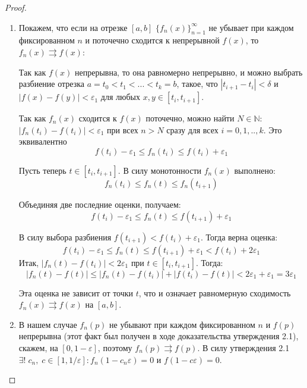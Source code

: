 \documentclass[12pt]{article}
\theoremstyle{plain}
\theoremstyle{definition}
\theoremstyle{remark}
\begin{document}
\begin{proof}
\begin{enumerate}
\begin{enumerate}[label=(\roman*):, font=\textit]
    \end{enumerate}

    Наконец, из всего этого следует, что 
    \[
        \text{ES}_p(X_n) \to \text{ES}_p(X) \text{ для всех } p \in [0, 1).
    \]

    Таким образом при всех $p \in [0,1)$ выполнено:
    \[
        f_n(p)\to f(p):=\text{ES}_p(X)-\text{VaR}_{1-\varepsilon}(X)
    \]

    \item 

    Покажем, что если на отрезке $[a,b]$ $\{f_n(x)\}_{n=1}^\infty$ не убывает при каждом фиксированном $n$ и поточечно сходится к непрерывной $f(x)$, то $f_n(x) \rightrightarrows f(x)$:

    Так как $f(x)$ непрерывна, то она равномерно непрерывно, и можно выбрать разбиение отрезка $a=t_0<t_1<...<t_k=b$, такое, что $|t_{i+1}-t_i|<\delta$ и $|f(x)-f(y)|<\varepsilon_1$ для любых $x,y\in [t_i,t_{i+1}]$.

    Так как $f_n(x)$ сходится к $f(x)$ поточечно, можно найти $N\in\mathbb{N}$: $|f_n(t_i)-f(t_i)|<\varepsilon_1$ при всех $n>N$ сразу для всех $i=0,1,..,k$. Это эквивалентно 
    \[
        f(t_i) -\varepsilon_1 \leq f_n(t_i) \leq f(t_i) +\varepsilon_1
    \]

    Пусть теперь $t\in [t_i,t_{i+1}]$. В силу монотонности $f_n(x)$ выполнено:
    \[
        f_n(t_i) \leq f_n(t) \leq f_n(t_{i+1})
    \]

    Объединяя две последние оценки, получаем:
    \[
        f(t_i) -\varepsilon_1 \leq f_n(t) \leq f(t_{i+1}) +\varepsilon_1
    \]

    В силу выбора разбиения $f(t_{i+1}) < f(t_i) + \varepsilon_1$. Тогда верна оценка:
    \[
        f(t_i) -\varepsilon_1 \leq f_n(t) \leq f(t_{i+1}) +\varepsilon_1 < f(t_i)+2\varepsilon_1
    \]
    Итак, $|f_n(t)-f(t_i)| < 2\varepsilon_1$ при $t\in[t_i, t_{i+1}]$. Тогда:
    \[
        |f_n(t)-f(t)| \leq |f_n(t)-f(t_i)| + |f(t_i)-f(t)| < 2\varepsilon_1 + \varepsilon_1 = 3\varepsilon_1
    \]

    Эта оценка не зависит от точки $t$, что и означает равномерную сходимость $f_n(x)\rightrightarrows f(x)$ на $[a,b]$.

    \item 
    В нашем случае $f_n(p)$ не убывают при каждом фиксированном $n$ и $f(p)$ непрерывна (этот факт был получен в ходе доказательства утверждения 2.1), скажем, на $[0, 1-\varepsilon]$, поэтому $f_n(p)\rightrightarrows f(p)$.
    В силу утверждения 2.1 $\exists!\;c_n,\;c\in[1,1/\varepsilon]: f_n(1-c_n\varepsilon)=0$ и $f(1-c\varepsilon)=0$.


\end{enumerate}
\end{proof}
\end{document}
